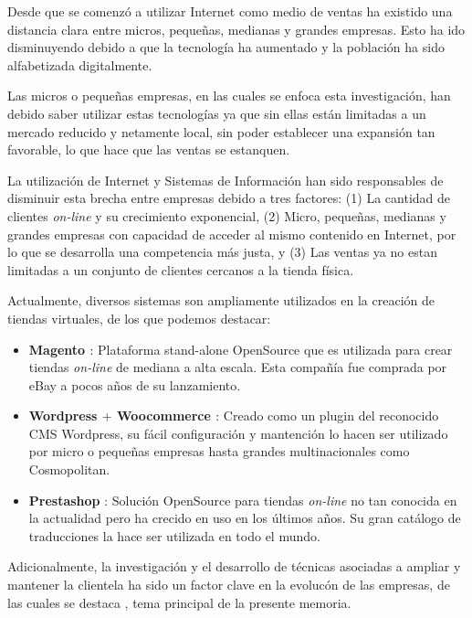 Desde que se comenzó a utilizar Internet como medio de ventas ha existido una
distancia clara entre micros, pequeñas, medianas y grandes empresas. Esto ha 
ido disminuyendo debido a que la tecnología ha aumentado y la población
ha sido alfabetizada digitalmente.

Las micros o pequeñas empresas, en las cuales se enfoca esta investigación, han debido
saber utilizar estas tecnologías ya que sin ellas están limitadas a un mercado reducido
 y netamente local, sin poder establecer una expansión tan favorable, lo que hace que las ventas se estanquen.

La utilización de Internet y Sistemas de Información han sido responsables de disminuir 
esta brecha entre empresas debido a tres factores: (1) La cantidad de clientes \emph{on-line}
y su crecimiento exponencial, (2) Micro, pequeñas, medianas y grandes empresas con capacidad
de acceder al mismo contenido en Internet, por lo que se desarrolla una competencia
más justa, y (3) Las ventas ya no estan limitadas a un conjunto de clientes
cercanos a la tienda física.

Actualmente, diversos sistemas son ampliamente utilizados en la creación
de tiendas virtuales, de los que podemos destacar:

\begin{itemize}
    \item {\bf Magento \cite{Magento} }:
        Plataforma stand-alone OpenSource que es utilizada para crear tiendas \emph{on-line}
        de mediana a alta escala.
        Esta compañía fue comprada por eBay a pocos años de su lanzamiento.

    \item {\bf Wordpress \cite{Wordpress} $+$ Woocommerce \cite{Woocommerce}}:
        Creado como un plugin del reconocido CMS Wordpress, su fácil configuración
        y mantención lo hacen ser utilizado por micro o pequeñas empresas hasta
        grandes multinacionales como Cosmopolitan.

    \item {\bf Prestashop} \cite{Prestashop}:
        Solución OpenSource para tiendas \emph{on-line} no tan conocida en la actualidad
        pero ha crecido en uso en los últimos años.
        Su gran catálogo de traducciones la hace ser utilizada en todo el mundo.

\end{itemize}

Adicionalmente, la investigación y el desarrollo de técnicas asociadas a ampliar
y mantener la clientela ha sido un factor clave en la evolucón de las empresas,
de las cuales se destaca {\gam}, tema principal de la presente memoria.

